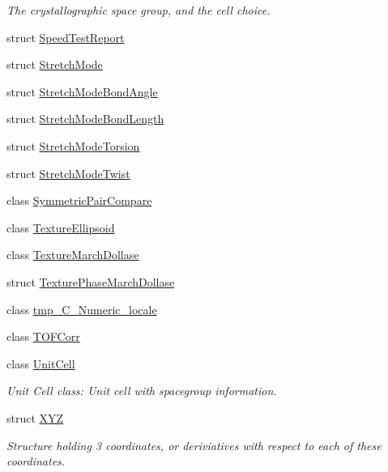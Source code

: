 \begin{DoxyCompactItemize}
\begin{DoxyCompactList}\small\item\em The crystallographic space group, and the cell choice. \end{DoxyCompactList}\item 
struct \mbox{\hyperlink{struct_obj_cryst_1_1_speed_test_report}{Speed\+Test\+Report}}
\item 
struct \mbox{\hyperlink{struct_obj_cryst_1_1_stretch_mode}{Stretch\+Mode}}
\item 
struct \mbox{\hyperlink{struct_obj_cryst_1_1_stretch_mode_bond_angle}{Stretch\+Mode\+Bond\+Angle}}
\item 
struct \mbox{\hyperlink{struct_obj_cryst_1_1_stretch_mode_bond_length}{Stretch\+Mode\+Bond\+Length}}
\item 
struct \mbox{\hyperlink{struct_obj_cryst_1_1_stretch_mode_torsion}{Stretch\+Mode\+Torsion}}
\item 
struct \mbox{\hyperlink{struct_obj_cryst_1_1_stretch_mode_twist}{Stretch\+Mode\+Twist}}
\item 
class \mbox{\hyperlink{class_obj_cryst_1_1_symmetric_pair_compare}{Symmetric\+Pair\+Compare}}
\item 
class \mbox{\hyperlink{class_obj_cryst_1_1_texture_ellipsoid}{Texture\+Ellipsoid}}
\item 
class \mbox{\hyperlink{class_obj_cryst_1_1_texture_march_dollase}{Texture\+March\+Dollase}}
\item 
struct \mbox{\hyperlink{struct_obj_cryst_1_1_texture_phase_march_dollase}{Texture\+Phase\+March\+Dollase}}
\item 
class \mbox{\hyperlink{class_obj_cryst_1_1tmp___c___numeric__locale}{tmp\+\_\+\+C\+\_\+\+Numeric\+\_\+locale}}
\item 
class \mbox{\hyperlink{class_obj_cryst_1_1_t_o_f_corr}{T\+O\+F\+Corr}}
\item 
class \mbox{\hyperlink{class_obj_cryst_1_1_unit_cell}{Unit\+Cell}}
\begin{DoxyCompactList}\small\item\em Unit Cell class\+: Unit cell with spacegroup information. \end{DoxyCompactList}\item 
struct \mbox{\hyperlink{struct_obj_cryst_1_1_x_y_z}{X\+YZ}}
\begin{DoxyCompactList}\small\item\em Structure holding 3 coordinates, or deriviatives with respect to each of these coordinates. \end{DoxyCompactList}\item 

\end{DoxyCompactItemize}
